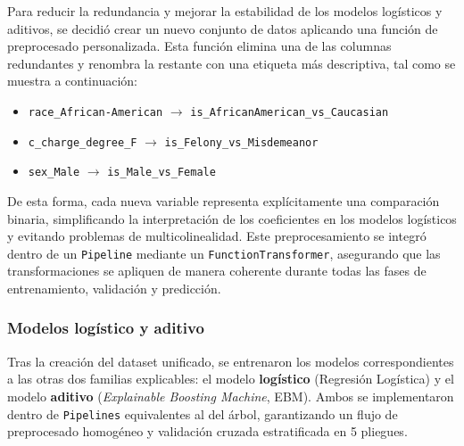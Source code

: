Para reducir la redundancia y mejorar la estabilidad de los modelos logísticos y aditivos, se decidió crear un nuevo conjunto de datos aplicando una función de preprocesado personalizada. Esta función elimina una de las columnas redundantes y renombra la restante con una etiqueta más descriptiva, tal como se muestra a continuación:

\begin{itemize}
    \item \texttt{race\_African-American} $\rightarrow$ \texttt{is\_AfricanAmerican\_vs\_Caucasian}
    \item \texttt{c\_charge\_degree\_F} $\rightarrow$ \texttt{is\_Felony\_vs\_Misdemeanor}
    \item \texttt{sex\_Male} $\rightarrow$ \texttt{is\_Male\_vs\_Female}
\end{itemize}

De esta forma, cada nueva variable representa explícitamente una comparación binaria, simplificando la interpretación de los coeficientes en los modelos logísticos y evitando problemas de multicolinealidad. Este preprocesamiento se integró dentro de un \texttt{Pipeline} mediante un \texttt{FunctionTransformer}, asegurando que las transformaciones se apliquen de manera coherente durante todas las fases de entrenamiento, validación y predicción.

\subsubsection{Modelos logístico y aditivo}

Tras la creación del dataset unificado, se entrenaron los modelos correspondientes a las otras dos familias explicables: el modelo \textbf{logístico} (Regresión Logística) y el modelo \textbf{aditivo} (\textit{Explainable Boosting Machine}, EBM). Ambos se implementaron dentro de \texttt{Pipelines} equivalentes al del árbol, garantizando un flujo de preprocesado homogéneo y validación cruzada estratificada en 5 pliegues.

